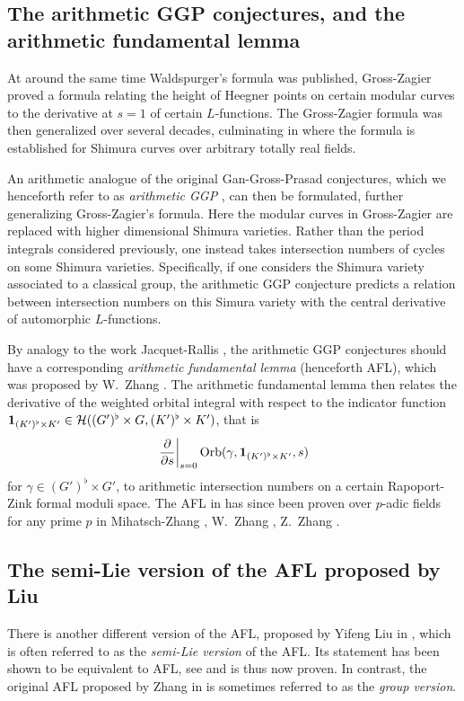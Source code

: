 \subsection{The arithmetic GGP conjectures, and the arithmetic fundamental lemma}
At around the same time Waldspurger's formula was published,
Gross-Zagier \cite{ref:gross_zagier} proved a formula
relating the height of Heegner points
on certain modular curves to the derivative at $s=1$ of certain $L$-functions.
The Gross-Zagier formula was then generalized over several decades,
culminating in \cite{ref:GZshimura} where the formula is established
for Shimura curves over arbitrary totally real fields.

An arithmetic analogue of the original Gan-Gross-Prasad conjectures,
which we henceforth refer to as \emph{arithmetic GGP} \cite{ref:GGP},
can then be formulated, further generalizing Gross-Zagier's formula.
Here the modular curves in Gross-Zagier
are replaced with higher dimensional Shimura varieties.
Rather than the period integrals considered previously,
one instead takes intersection numbers of cycles on some Shimura varieties.
Specifically, if one considers the Shimura variety associated to a classical group,
the arithmetic GGP conjecture predicts a relation between intersection numbers
on this Simura variety with the central derivative of automorphic $L$-functions.

By analogy to the work Jacquet-Rallis \cite{ref:JR},
the arithmetic GGP conjectures should have a corresponding
\emph{arithmetic fundamental lemma} (henceforth AFL),
which was proposed by W.\ Zhang \cite[Conjecture 2.9]{ref:AFL}.
The arithmetic fundamental lemma then relates the derivative
of the weighted orbital integral with respect to the indicator function
$\mathbf{1}_{(K')^\flat \times K'} \in \mathcal H((G')^\flat \times G, (K')^\flat \times K')$, that is
\[ \left. \pdv{}{s} \right\rvert_{s=0} \operatorname{Orb}(\gamma, \mathbf{1}_{(K')^\flat \times K'}, s) \]
for $\gamma \in (G')^\flat \times G'$,
to arithmetic intersection numbers on a certain Rapoport-Zink formal moduli space.
The AFL in \cite{ref:AFL} has since been proven over $p$-adic fields for any prime $p$ in
Mihatsch-Zhang \cite{ref:MZ2021}, W.\ Zhang \cite{ref:Wei2021}, Z.\ Zhang \cite{ref:Zhiyu}.

\subsection{The semi-Lie version of the AFL proposed by Liu}
There is another different version of the AFL, proposed by Yifeng Liu in
\cite[Conjecture 1.12]{ref:liuFJ},
which is often referred to as the \emph{semi-Lie version} of the AFL.
Its statement has been shown to be equivalent to AFL,
see \cite[Remark 1.13]{ref:liuFJ} and is thus now proven.
In contrast, the original AFL proposed by Zhang in \cite[Conjecture 2.9]{ref:AFL}
is sometimes referred to as the \emph{group version}.

